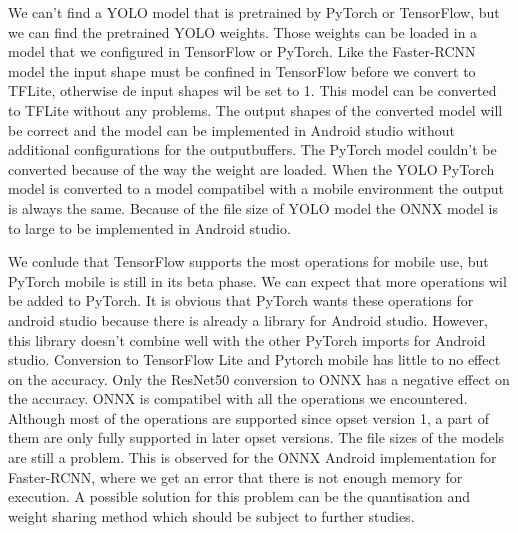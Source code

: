 We can't find a YOLO model that is pretrained by PyTorch or TensorFlow, but we can find the pretrained YOLO weights.
Those weights can be loaded in a model that we configured in TensorFlow or PyTorch.
Like the Faster-RCNN model the input shape must be confined in TensorFlow before we convert to TFLite, otherwise de input shapes wil be set to 1.
This model can be converted to TFLite without any problems.
The output shapes of the converted model will be correct and the model can be implemented in Android studio without additional configurations for the outputbuffers.
The PyTorch model couldn't be converted because of the way the weight are loaded.
When the YOLO PyTorch model is converted to a model compatibel with a mobile environment the output is always the same.
Because of the file size of YOLO model the ONNX model is to large to be implemented in Android studio.

We conlude that TensorFlow supports the most operations for mobile use, but PyTorch mobile is still in its beta phase.
We can expect that more operations wil be added to PyTorch.
It is obvious that PyTorch wants these operations for android studio because there is already a library for Android studio.
However, this library doesn't combine well with the other PyTorch imports for Android studio.
Conversion to TensorFlow Lite and Pytorch mobile has little to no effect on the accuracy.
Only the ResNet50 conversion to ONNX has a negative effect on the accuracy.
ONNX is compatibel with all the operations we encountered.
Although most of the operations are supported since opset version 1, a part of them are only fully supported in later opset versions.
The file sizes of the models are still a problem.
This is observed for the ONNX Android implementation for Faster-RCNN, where we get an error that there is not enough memory for execution.
A possible solution for this problem can be the quantisation and weight sharing method which should be subject to further studies.

